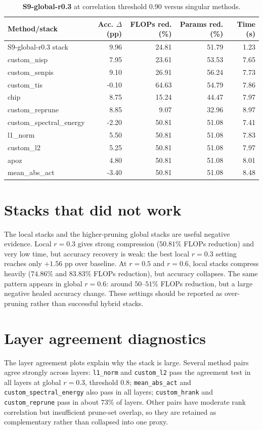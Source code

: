 \documentclass[11pt]{article}
\newcommand{\stackname}[1]{\textbf{#1}}
\begin{document}
\begin{table}[H]\centering\caption{\stackname{S9-global-r0.3} at correlation threshold $0.90$ versus singular methods.}\label{tab:singular}\begin{tabular}{lrrrr}\toprule Method/stack & Acc. $\Delta$ (pp) & FLOPs red. (\%) & Params red. (\%) & Time (s) \\ \midrule
S9-global-r0.3 stack & 9.96 & 24.81 & 51.79 & 1.23 \\
custom\_nisp & 7.95 & 23.61 & 53.53 & 7.65 \\
custom\_senpis & 9.10 & 26.91 & 56.24 & 7.73 \\
custom\_tis & -0.10 & 64.63 & 54.79 & 7.86 \\
chip & 8.75 & 15.24 & 44.47 & 7.97 \\
custom\_reprune & 8.85 & 9.07 & 32.96 & 8.97 \\
custom\_spectral\_energy & -2.20 & 50.81 & 51.08 & 7.41 \\
l1\_norm & 5.50 & 50.81 & 51.08 & 7.83 \\
custom\_l2 & 5.25 & 50.81 & 51.08 & 7.97 \\
apoz & 4.80 & 50.81 & 51.08 & 8.01 \\
mean\_abs\_act & -3.40 & 50.81 & 51.08 & 8.48 \\
\bottomrule\end{tabular}\end{table}

\section*{Stacks that did not work}
The local stacks and the higher-pruning global stacks are useful negative evidence.  Local $r=0.3$ gives strong compression ($50.81\%$ FLOPs reduction) and very low time, but accuracy recovery is weak: the best local $r=0.3$ setting reaches only $+1.56$ pp over baseline.  At $r=0.5$ and $r=0.6$, local stacks compress heavily ($74.86\%$ and $83.83\%$ FLOPs reduction), but accuracy collapses.  The same pattern appears in global $r=0.6$: around $50$--$51\%$ FLOPs reduction, but a large negative healed accuracy change.  These settings should be reported as over-pruning rather than successful hybrid stacks.

\section*{Layer agreement diagnostics}
The layer agreement plots explain why the stack is large.  Several method pairs agree strongly across layers: \texttt{l1\_norm} and \texttt{custom\_l2} pass the agreement test in all layers at global $r=0.3$, threshold $0.8$; \texttt{mean\_abs\_act} and \texttt{custom\_spectral\_energy} also pass in all layers; \texttt{custom\_hrank} and \texttt{custom\_reprune} pass in about $73\%$ of layers.  Other pairs have moderate rank correlation but insufficient prune-set overlap, so they are retained as complementary rather than collapsed into one proxy.
\end{document}

